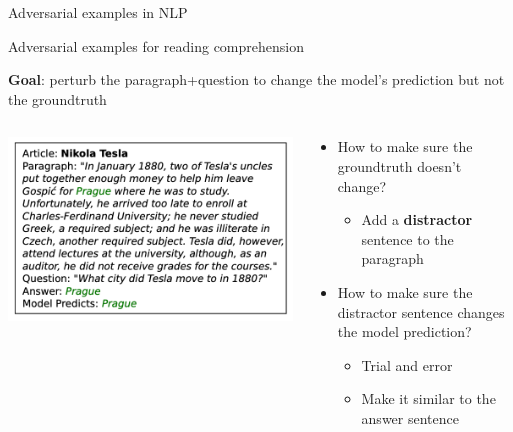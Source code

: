\documentclass[usenames,dvipsnames,notes,11pt,aspectratio=169,hyperref={colorlinks=true, linkcolor=blue}]{beamer}
\begin{document}
\begin{frame}
    {Adversarial examples in NLP}

    Adversarial examples for reading comprehension 

    {\bf Goal}: perturb the paragraph+question to change the model's prediction but not the groundtruth 
    \medskip
    \begin{columns}
        \begin{column}{0.4\textwidth}
            \includegraphics[width=\textwidth]{figures/advqa}
        \end{column}
        \begin{column}{0.6\textwidth}
            \begin{itemize}
                \item How to make sure the groundtruth doesn't change?
                    \pause
                    \begin{itemize}
                \item Add a \textbf{distractor} sentence to the paragraph
                    \end{itemize}
                \item How to make sure the distractor sentence changes the model prediction?\pause
                    \begin{itemize}
                        \item Trial and error
                        \item Make it similar to the answer sentence
                    \end{itemize}
            \end{itemize}
        \end{column}
    \end{columns}
\end{frame}
\end{document}
